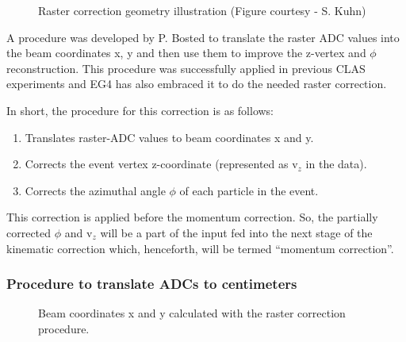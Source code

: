 \begin{figure}[htpb] %
\centerline{}
\caption{Raster correction geometry illustration (Figure courtesy - S. Kuhn)}
\label{fig:RstGeoKuhn2}
\end{figure}

A procedure was developed by P. Bosted \etal \cite{rstcor_cn} to translate the raster ADC values %
into the beam coordinates x, y and then use them to improve the z-vertex and $\phi$ reconstruction. This procedure was successfully applied in previous CLAS experiments and EG4 has also embraced it to do the needed raster correction.


In short, the procedure for this correction is as follows: %
\begin{enumerate}
\item Translates raster-ADC values to beam coordinates x and y.
\item Corrects the event vertex z-coordinate (represented as v$_z$ in the data). %
\item Corrects the azimuthal angle $\phi$ of each particle in the event.
\end{enumerate} 

This correction is applied before the momentum correction. So, the partially corrected $\phi$ and v$_z$ will be a part 
of the input fed into the next stage of the kinematic correction which, henceforth, will be termed ``momentum correction''.



\subsubsection{Procedure to translate ADCs to centimeters}

\begin{figure}[htpb] %
\centerline{}  %
\caption{Beam coordinates x and y calculated with the raster correction procedure.}
\label{fig:RstXY}
\end{figure}

